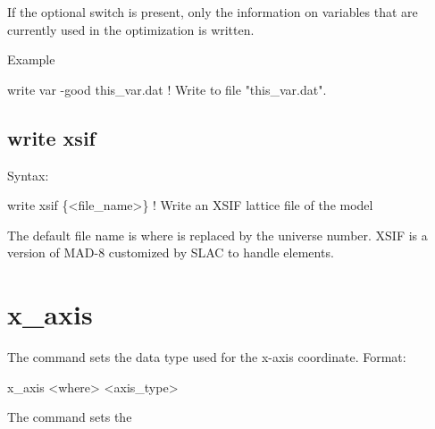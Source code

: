 {{{{{{{{{{{{If the optional  switch is present, only the information on variables that are
currently used in the optimization is written.

Example
\begin{example}
  write var -good this_var.dat  ! Write to file "this_var.dat".
\end{example}


\subsection{write xsif}
\label{s:write.xsif}

Syntax:
\begin{example}
    write xsif \{<file_name>\}  ! Write an XSIF lattice file of the model
\end{example}

The default file name is  where \vn{\#} is replaced by the universe number. XSIF is
a version of MAD-8 customized by SLAC to handle  elements.


\section{x_axis}
\label{s:x.axis}

The  command sets the data type used for the x-axis coordinate. Format:
\begin{example}
  x_axis <where> <axis_type>
\end{example}

\vskip 7pt

The  command sets the \vn{plot%
for the horizontal axis. Possibilities for \vn{<axis_type>} are:
\begin{example}
  index     -- Use data index
  ele_index -- Use data element index
  s         -- Use longitudinal position.
\end{example}
Note that \vn{index} only makes sense for data that has an index associated with it.

Examples:
\begin{example}
  x_axis * s
  x_axis top index
\end{example}

}}}}}}}}}}}}}
